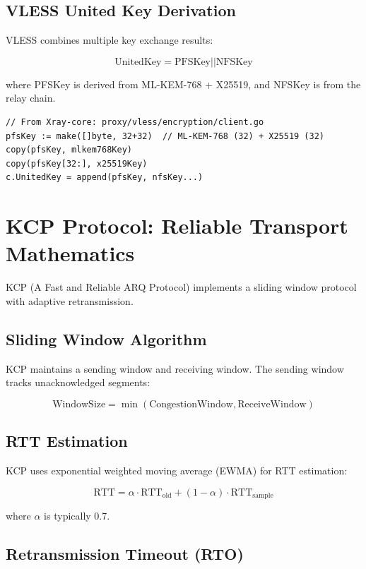 \subsection{VLESS United Key Derivation}

VLESS combines multiple key exchange results:

\[
\text{UnitedKey} = \text{PFSKey} || \text{NFSKey}
\]

where PFSKey is derived from ML-KEM-768 + X25519, and NFSKey is from the relay chain.

\begin{verbatim}
// From Xray-core: proxy/vless/encryption/client.go
pfsKey := make([]byte, 32+32)  // ML-KEM-768 (32) + X25519 (32)
copy(pfsKey, mlkem768Key)
copy(pfsKey[32:], x25519Key)
c.UnitedKey = append(pfsKey, nfsKey...)
\end{verbatim}

\section{KCP Protocol: Reliable Transport Mathematics}

KCP (A Fast and Reliable ARQ Protocol) implements a sliding window protocol with adaptive retransmission.

\subsection{Sliding Window Algorithm}

KCP maintains a sending window and receiving window. The sending window tracks unacknowledged segments:

\[
\text{WindowSize} = \min(\text{CongestionWindow}, \text{ReceiveWindow})
\]

\subsection{RTT Estimation}

KCP uses exponential weighted moving average (EWMA) for RTT estimation:

\[
\text{RTT} = \alpha \cdot \text{RTT}_{\text{old}} + (1-\alpha) \cdot \text{RTT}_{\text{sample}}
\]

where $\alpha$ is typically 0.7.

\subsection{Retransmission Timeout (RTO)}

